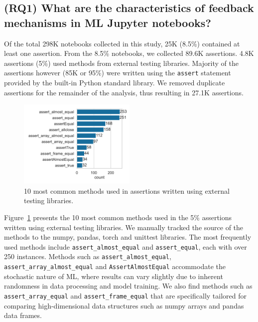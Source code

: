\subsection{(RQ1) What are the characteristics of feedback mechanisms in ML Jupyter notebooks?}

Of the total 298K notebooks collected in this study, 25K (8.5\%) contained at least one assertion. From the 8.5\% notebooks, we collected 89.6K assertions. 4.8K assertions (5\%) used methods from external testing libraries. Majority of the assertions however (85K or 95\%) were written using the \lstinline{assert} statement provided by the built-in Python standard library. We removed duplicate assertions for the remainder of the analysis, thus resulting in 27.1K assertions.

\begin{figure}
  \centering
  \includegraphics[width=0.5\textwidth]{other-test-methods.pdf}
  \caption{10 most common methods used in assertions written using external testing libraries.}
  \label{fig:other-test-methods}
\end{figure}

Figure~\ref{fig:other-test-methods} presents the 10 most common methods used in the 5\% assertions written using external testing libraries. We manually tracked the source of the methods to the numpy, pandas, torch and unittest libraries. The most frequently used methods include \lstinline{assert_almost_equal} and \lstinline{assert_equal}, each with over 250 instances. Methods such as \lstinline{assert_almost_equal}, \lstinline{assert_array_almost_equal} and \lstinline{AssertAlmostEqual} accommodate the stochastic nature of ML, where results can vary slightly due to inherent randomness in data processing and model training. We also find methods such as \lstinline{assert_array_equal} and \lstinline{assert_frame_equal} that are specifically tailored for comparing high-dimensional data structures such as numpy arrays and pandas data frames.

